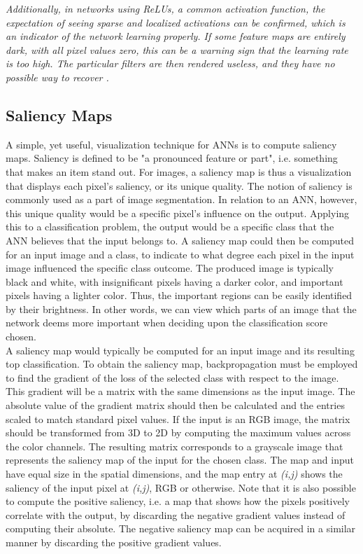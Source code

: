 \noindent \textit{Additionally, in networks using ReLUs, a common activation function, the expectation of seeing sparse and localized activations can be confirmed, which is an indicator of the network learning properly. If some feature maps are entirely dark, with all pixel values zero, this can be a warning sign that the learning rate is too high. The particular filters are then rendered useless, and they have no possible way to recover \cite{cs231n_act}. }

\subsection{Saliency Maps}

A simple, yet useful, visualization technique for ANNs is to compute saliency maps. Saliency is defined to be "a pronounced feature or part", i.e. something that makes an item stand out. For images, a saliency map is thus a visualization that displays each pixel's saliency, or its unique quality. The notion of saliency is commonly used as a part of image segmentation. In relation to an ANN, however, this unique quality would be a specific pixel's influence on the output. Applying this to a classification problem, the output would be a specific class that the ANN believes that the input belongs to. A saliency map could then be computed for an input image and a class, to indicate to what degree each pixel in the input image influenced the specific class outcome. The produced image is typically black and white, with insignificant pixels having a darker color, and important pixels having a lighter color. Thus, the important regions can be easily identified by their brightness. In other words, we can view which parts of an image that the network deems more important when deciding upon the classification score chosen. \\

\noindent A saliency map would typically be computed for an input image and its resulting top classification. To obtain the saliency map, backpropagation must be employed to find the gradient of the loss of the selected class with respect to the image. This gradient will be a matrix with the same dimensions as the input image. The absolute value of the gradient matrix should then be calculated and the entries scaled to match standard pixel values. If the input is an RGB image, the matrix should be transformed from 3D to 2D by computing the maximum values across the color channels. The resulting matrix corresponds to a grayscale image that represents the saliency map of the input for the chosen class. The map and input have equal size in the spatial dimensions, and the map entry at \textit{(i,j)} shows the saliency of the input pixel at \textit{(i,j)}, RGB or otherwise. Note that it is also possible to compute the positive saliency, i.e. a map that shows how the pixels positively correlate with the output, by discarding the negative gradient values instead of computing their absolute. The negative saliency map can be acquired in a similar manner by discarding the positive gradient values.

